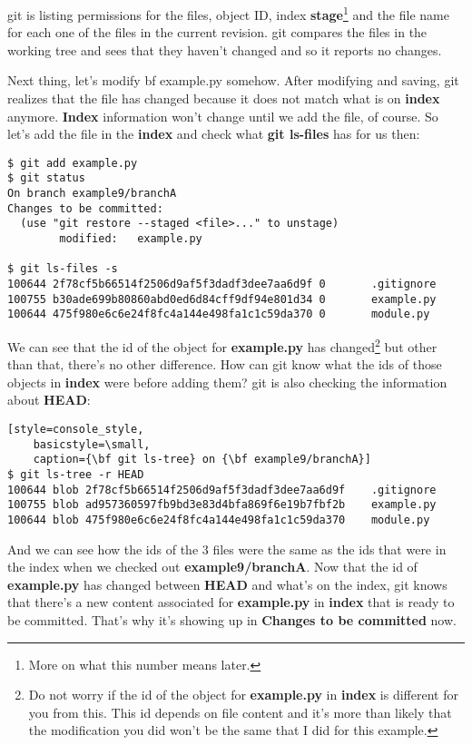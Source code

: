 git is listing permissions for the files, object ID, index {\bf stage}\footnote{More on what this number means later.} and the
file name for each one of the files in the current revision. git compares the files in the working tree and sees that they haven't
changed and so it reports no changes. 

Next thing, let's modify {bf example.py} somehow. After modifying and saving, git realizes that the file has changed because
it does not match what is on {\bf index} anymore. {\bf Index} information won't change until we add the file, of course. So let's
add the file in the {\bf index} and check what {\bf git ls-files} has for us then:

\begin{lstlisting}[style=console_style,
	basicstyle=\small,
	caption={\bf git ls-files} on a modified file]
$ git add example.py
$ git status
On branch example9/branchA
Changes to be committed:
  (use "git restore --staged <file>..." to unstage)
        modified:   example.py

$ git ls-files -s
100644 2f78cf5b66514f2506d9af5f3dadf3dee7aa6d9f 0       .gitignore
100755 b30ade699b80860abd0ed6d84cff9df94e801d34 0       example.py
100644 475f980e6c6e24f8fc4a144e498fa1c1c59da370 0       module.py
\end{lstlisting}

We can see that the id of the object for {\bf example.py} has changed\footnote{Do not worry if the id of the object for {\bf example.py}
in {\bf index} is different for you from this. This id depends on file content and it's more than likely that the modification you did
won't be the same that I did for this example.} but other than that, there's no other difference. How can git know what the ids of
those objects in {\bf index} were before adding them? git is also checking the information about {\bf HEAD}:

\begin{lstlisting}[style=console_style,
	basicstyle=\small,
	caption={\bf git ls-tree} on {\bf example9/branchA}]
$ git ls-tree -r HEAD
100644 blob 2f78cf5b66514f2506d9af5f3dadf3dee7aa6d9f    .gitignore
100755 blob ad957360597fb9bd3e83d4bfa869f6e19b7fbf2b    example.py
100644 blob 475f980e6c6e24f8fc4a144e498fa1c1c59da370    module.py
\end{lstlisting}

And we can see how the ids of the 3 files were the same as the ids that were in the index when we checked out {\bf example9/branchA}.
Now that the id of {\bf example.py} has changed between {\bf HEAD} and what's on the index, git knows that there's a new content associated for {\bf example.py} in {\bf index} that is ready to be committed. That's why it's showing up in {\bf Changes to be committed} now.

